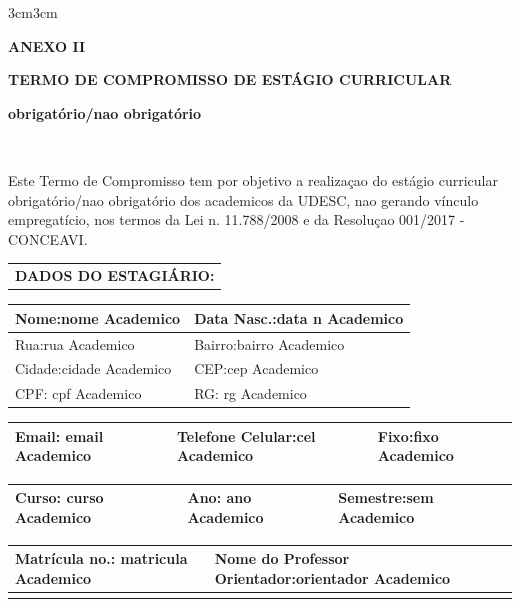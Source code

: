 \documentclass[10pt,a4paper]{article}
\begin{document}
\marginsize {2.5cm}{2.5cm}  {3cm}{3cm}
	
	

	



\begin{center}\textbf{ANEXO II}\end{center}


\begin{center}\textbf{TERMO DE COMPROMISSO DE ESTÁGIO CURRICULAR }
\end{center}

\begin{center}\textbf{obrigatório/nao obrigatório}
\end{center}
\begin{center}
\textbf	\\
\end{center}
Este Termo de Compromisso tem por objetivo a realizaçao do estágio 
curricular obrigatório/nao obrigatório dos academicos da UDESC, nao 
gerando vínculo empregatício, nos termos da Lei n. 11.788/2008 e da 
Resoluçao 001/2017 - CONCEAVI.
\\


\begin{table}[ht]
\begin{tabular*}{1\textwidth}{p{16cm}}
\textbf{DADOS DO ESTAGIÁRIO:}\\
\end{tabular*}
\centering
\begin{tabular*}{1\textwidth}{p{10cm}p{6cm}}

Nome:nome Academico & Data Nasc.:data n Academico \\
\hline
Rua:rua Academico & Bairro:bairro Academico \\
\hline
Cidade:cidade Academico &CEP:cep Academico \\
\hline
CPF: cpf Academico &RG: rg Academico \\
\hline
\end{tabular*}
\begin{tabular*}{1\textwidth}{p{7cm}p{5cm}p{4cm}}
Email: email Academico & Telefone Celular:cel Academico &Fixo:fixo Academico \\
\hline
\end{tabular*}
\begin{tabular*}{1\textwidth}{p{9cm}p{3cm}p{4cm}}
Curso: curso Academico & Ano: ano Academico &Semestre:sem Academico \\
\hline
\end{tabular*}
\begin{tabular*}{1\textwidth}{p{6cm}p{10cm}}
Matrícula no.: matricula Academico &Nome do Professor Orientador:orientador Academico \\
\hline
&\\
\end{tabular*}
\end{table}
\end{document}
